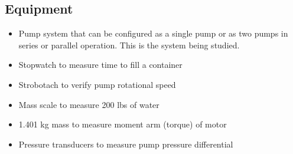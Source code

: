 


\subsection{Equipment}
\begin{itemize}
    \item Pump system that can be configured as a single pump or as two pumps in series or parallel operation. This is the system being studied.
    \item Stopwatch to measure time to fill a container 
    \item Strobotach to verify pump rotational speed
    \item Mass scale to measure 200 lbs of water
    \item 1.401 kg mass to measure moment arm (torque) of motor
    \item Pressure transducers to measure pump pressure differential
\end{itemize}

